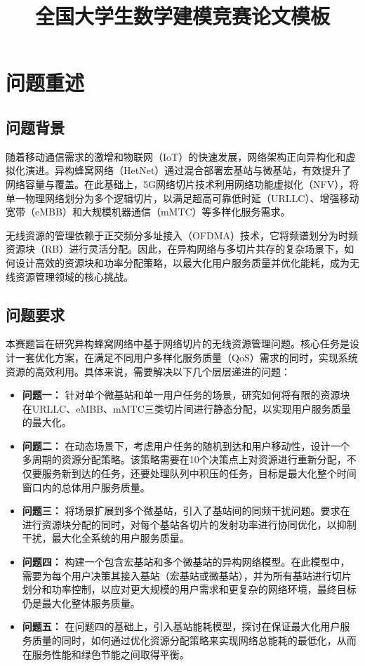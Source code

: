 \documentclass[withoutpreface,bwprint]{cumcmthesis}
\title{全国大学生数学建模竞赛论文模板}  %
\begin{document}
\maketitle


\tableofcontents  %
\newpage

\section{问题重述}
\subsection{问题背景}
随着移动通信需求的激增和物联网（IoT）的快速发展，网络架构正向异构化和虚拟化演进。异构蜂窝网络（HetNet）通过混合部署宏基站与微基站，有效提升了网络容量与覆盖。在此基础上，5G网络切片技术利用网络功能虚拟化（NFV），将单一物理网络划分为多个逻辑切片，以满足超高可靠低时延（URLLC）、增强移动宽带（eMBB）和大规模机器通信（mMTC）等多样化服务需求。

无线资源的管理依赖于正交频分多址接入（OFDMA）技术，它将频谱划分为时频资源块（RB）进行灵活分配。因此，在异构网络与多切片共存的复杂场景下，如何设计高效的资源块和功率分配策略，以最大化用户服务质量并优化能耗，成为无线资源管理领域的核心挑战。

\subsection{问题要求}
本赛题旨在研究异构蜂窝网络中基于网络切片的无线资源管理问题。核心任务是设计一套优化方案，在满足不同用户多样化服务质量（QoS）需求的同时，实现系统资源的高效利用。具体来说，需要解决以下几个层层递进的问题：

\begin{itemize}
    \item \textbf{问题一：} 针对单个微基站和单一用户任务的场景，研究如何将有限的资源块在URLLC、eMBB、mMTC三类切片间进行静态分配，以实现用户服务质量的最大化。
    \item \textbf{问题二：} 在动态场景下，考虑用户任务的随机到达和用户移动性，设计一个多周期的资源分配策略。该策略需要在10个决策点上对资源进行重新分配，不仅要服务新到达的任务，还要处理队列中积压的任务，目标是最大化整个时间窗口内的总体用户服务质量。
    \item \textbf{问题三：} 将场景扩展到多个微基站，引入了基站间的同频干扰问题。要求在进行资源块分配的同时，对每个基站各切片的发射功率进行协同优化，以抑制干扰，最大化全系统的用户服务质量。
    \item \textbf{问题四：} 构建一个包含宏基站和多个微基站的异构网络模型。在此模型中，需要为每个用户决策其接入基站（宏基站或微基站），并为所有基站进行切片划分和功率控制，以应对更大规模的用户需求和更复杂的网络环境，最终目标仍是最大化整体服务质量。
    \item \textbf{问题五：} 在问题四的基础上，引入基站能耗模型，探讨在保证最大化用户服务质量的同时，如何通过优化资源分配策略来实现网络总能耗的最低化，从而在服务性能和绿色节能之间取得平衡。
\end{itemize}
\end{document}
